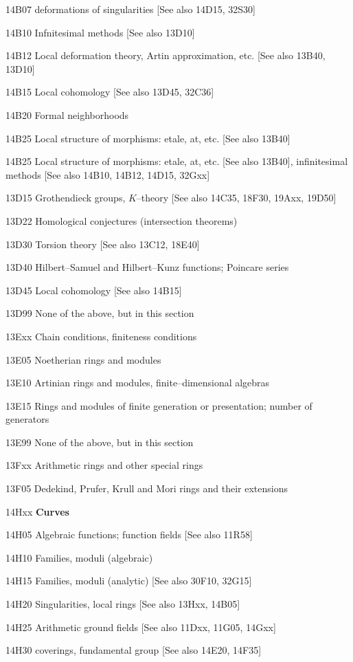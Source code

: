 \documentclass[12pt]{article}
\theoremstyle{plain}
\theoremstyle{definition}
\numberwithin{equation}{section}
\begin{document}
{14B07 deformations of singularities [See also 14D15, 32S30]

14B10 Infnitesimal methods [See also 13D10]

14B12 Local deformation theory, Artin approximation, etc. [See also 13B40, 13D10]

14B15 Local cohomology [See also 13D45, 32C36]

14B20 Formal neighborhoods

14B25 Local structure of morphisms: etale, at, etc. [See also 13B40]

14B25 Local structure of morphisms: etale, at, etc. [See also 13B40], infinitesimal methods [See also 14B10, 14B12, 14D15, 32Gxx]

13D15 Grothendieck groups, $K$--theory [See also 14C35, 18F30, 19Axx, 19D50]

13D22 Homological conjectures (intersection theorems)

13D30 Torsion theory [See also 13C12, 18E40]

13D40 Hilbert--Samuel and Hilbert--Kunz functions; Poincare series

13D45 Local cohomology [See also 14B15]

13D99 None of the above, but in this section

13Exx Chain conditions, finiteness conditions

13E05 Noetherian rings and modules

13E10 Artinian rings and modules, finite--dimensional algebras

13E15 Rings and modules of finite generation or presentation; number of generators

13E99 None of the above, but in this section

13Fxx Arithmetic rings and other special rings

13F05 Dedekind, Prufer, Krull and Mori rings and their extensions

14Hxx {\bf Curves}

14H05 Algebraic functions; function fields [See also 11R58]

14H10 Families, moduli (algebraic)

14H15 Families, moduli (analytic) [See also 30F10, 32G15]

14H20 Singularities, local rings [See also 13Hxx, 14B05]

14H25 Arithmetic ground fields [See also 11Dxx, 11G05, 14Gxx]

14H30 coverings, fundamental group [See also 14E20, 14F35]

}
\end{document}
